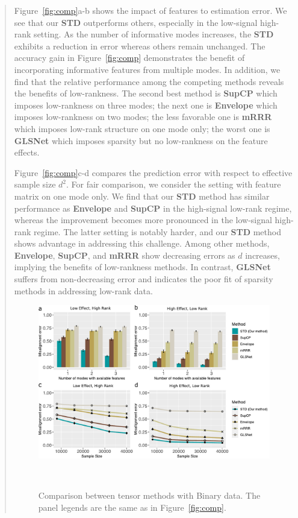 \documentclass[11pt]{article}
\theoremstyle{plain}
\theoremstyle{definition}
\begin{document}
\begin{enumerate}[wide, labelwidth=!, labelindent=0pt]
\begin{enumerate}[wide, labelwidth=!, labelindent=0pt]
\begin{quote}
Figure~\ref{fig:comp}a-b shows the impact of features to estimation error. We see that our \textbf{STD} outperforms others, especially in the low-signal high-rank setting. As the number of informative modes increases, the \textbf{STD} exhibits a reduction in error whereas others remain unchanged. The accuracy gain in Figure~\ref{fig:comp} demonstrates the benefit of incorporating informative features from multiple modes. In addition, we find that the relative performance among the competing methods reveals the benefits of low-rankness. 
The second best method is \textbf{SupCP} which imposes low-rankness on three modes; the next one is \textbf{Envelope} which imposes low-rankness on two modes; the less favorable one is \textbf{mRRR} which imposes low-rank structure on one mode only; the worst one is \textbf{GLSNet} which imposes sparsity but no low-rankness on the feature effects. 

Figure~\ref{fig:comp}c-d compares the prediction error with respect to effective sample size $d^2$. For fair comparison, we consider the setting with feature matrix on one mode only. We find that our \textbf{STD} method has similar performance as \textbf{Envelope} and \textbf{SupCP} in the high-signal low-rank regime, whereas the improvement becomes more pronounced in the low-signal high-rank regime. The latter setting is notably harder, and our \textbf{STD} method shows advantage in addressing this challenge. Among other methods, \textbf{Envelope}, \textbf{SupCP}, and \textbf{mRRR} show decreasing errors as $d$ increases, implying the benefits of low-rankness methods. In contrast, \textbf{GLSNet} suffers from non-decreasing error and indicates the poor fit of sparsity methods in addressing low-rank data. 

\begin{figure}[htb]
\centering
\includegraphics[width=12cm]{comp_final_binary.pdf} 
\caption{Comparison between tensor methods with Binary data. The panel legends are the same as in Figure~\ref{fig:comp}.}~\label{fig:comp_b}
\end{figure}


\end{quote}
\end{enumerate}
\end{enumerate}
\end{document}
